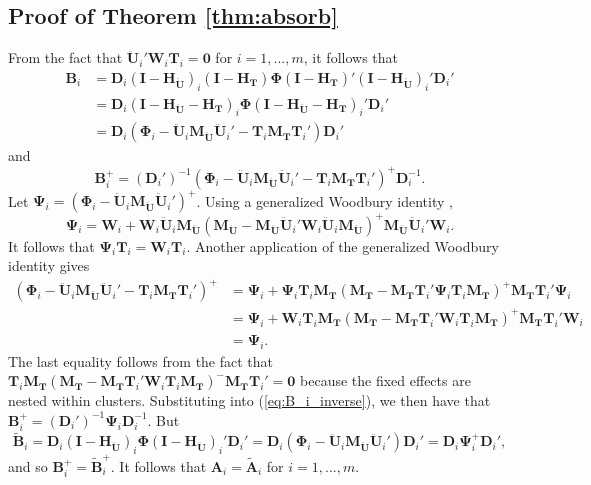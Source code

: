 \documentclass[12pt]{article}\usepackage[]{graphicx}\usepackage[]{color}
\newcommand{\bm}{\mathbf}
\newcommand{\bs}{\boldsymbol}
\begin{document}
\subsection{Proof of Theorem \ref{thm:absorb}}

From the fact that $\bm{\ddot{U}}_i'\bm{W}_i\bm{T}_i = \bm{0}$ for $i = 1,...,m$, it follows that \begin{align*}
\bm{B}_i &= \bm{D}_i \left(\bm{I} - \bm{H_{\ddot{U}}}\right)_i \left(\bm{I} - \bm{H_T}\right) \bs\Phi \left(\bm{I} - \bm{H_T}\right)' \left(\bm{I} - \bm{H_{\ddot{U}}}\right)_i' \bm{D}_i'\\
&= \bm{D}_i \left(\bm{I} - \bm{H_{\ddot{U}}} - \bm{H_T}\right)_i \bs\Phi \left(\bm{I} - \bm{H_{\ddot{U}}} - \bm{H_T}\right)_i' \bm{D}_i' \\
&= \bm{D}_i \left(\bs\Phi_i - \bm{\ddot{U}}_i \bm{M_{\ddot{U}}}\bm{\ddot{U}}_i' - \bm{T}_i \bm{M_T}\bm{T}_i'\right)\bm{D}_i'
\end{align*}
and 
\begin{equation}
\label{eq:B_i_inverse}
\bm{B}_i^+ = \left(\bm{D}_i'\right)^{-1} \left(\bs\Phi_i - \bm{\ddot{U}}_i \bm{M_{\ddot{U}}}\bm{\ddot{U}}_i' - \bm{T}_i \bm{M_T}\bm{T}_i'\right)^+ \bm{D}_i^{-1}.
\end{equation}
Let $\bs\Psi_i = \left(\bs\Phi_i - \bm{\ddot{U}}_i \bm{M_{\ddot{U}}}\bm{\ddot{U}}_i'\right)^+$.
Using a generalized Woodbury identity \citep{Henderson1981on}, \[
\bs\Psi_i = \bm{W}_i + \bm{W}_i \bm{\ddot{U}}_i \bm{M_{\ddot{U}}}\left(\bm{M_{\ddot{U}}} - \bm{M_{\ddot{U}}} \bm{\ddot{U}}_i' \bm{W}_i \bm{\ddot{U}}_i \bm{M_{\ddot{U}}}\right)^+ \bm{M_{\ddot{U}}}\bm{\ddot{U}}_i'\bm{W}_i. \]
It follows that $\bs\Psi_i \bm{T}_i = \bm{W}_i \bm{T}_i$. 
Another application of the generalized Woodbury identity gives 
\begin{align*}
\left(\bs\Phi_i - \bm{\ddot{U}}_i \bm{M_{\ddot{U}}}\bm{\ddot{U}}_i' - \bm{T}_i \bm{M_T}\bm{T}_i'\right)^+ &= \bs\Psi_i + \bs\Psi_i \bm{T}_i \bm{M_T}\left(\bm{M_T} - \bm{M_T}\bm{T}_i' \bs\Psi_i \bm{T}_i \bm{M_T}\right)^+ \bm{M_T} \bm{T}_i' \bs\Psi_i \\
&= \bs\Psi_i + \bm{W}_i \bm{T}_i \bm{M_T}\left(\bm{M_T} - \bm{M_T}\bm{T}_i' \bm{W}_i \bm{T}_i\bm{M_T}\right)^+ \bm{M_T} \bm{T}_i' \bm{W}_i \\
&= \bs\Psi_i.
\end{align*}
The last equality follows from the fact that $\bm{T}_i \bm{M_T}\left(\bm{M_T} - \bm{M_T}\bm{T}_i' \bm{W}_i \bm{T}_i\bm{M_T}\right)^{-} \bm{M_T} \bm{T}_i' = \bm{0}$ because the fixed effects are nested within clusters. 
Substituting into (\ref{eq:B_i_inverse}), we then have that $\bm{B}_i^+ = \left(\bm{D}_i'\right)^{-1} \bs\Psi_i \bm{D}_i^{-1}$. 
But \[
\bm{\tilde{B}}_i = \bm{D}_i \left(\bm{I} - \bm{H_{\ddot{U}}}\right)_i \bs\Phi \left(\bm{I} - \bm{H_{\ddot{U}}}\right)_i' \bm{D}_i' = \bm{D}_i \left(\bs\Phi_i - \bm{\ddot{U}}_i\bm{M_{\ddot{U}}} \bm{\ddot{U}}_i'\right) \bm{D}_i' = \bm{D}_i \bs\Psi_i^+ \bm{D}_i',
\]
and so $\bm{B}_i^+ = \bm{\tilde{B}}_i^+$. It follows that $\bm{A}_i = \bm{\tilde{A}}_i$ for $i = 1,...,m$. 
\end{document}
